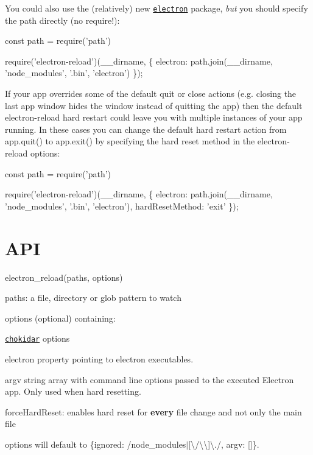 You could also use the (relatively) new \href{https://www.npmjs.com/package/electron}{\tt {\ttfamily electron}} package, {\itshape but} you should specify the path directly (no {\ttfamily require}!)\+:


\begin{DoxyCode}
const path = require('path')

require('electron-reload')(\_\_dirname, \{
  electron: path.join(\_\_dirname, 'node\_modules', '.bin', 'electron')
\});
\end{DoxyCode}


If your app overrides some of the default {\ttfamily quit} or {\ttfamily close} actions (e.\+g. closing the last app window hides the window instead of quitting the app) then the default {\ttfamily electron-\/reload} hard restart could leave you with multiple instances of your app running. In these cases you can change the default hard restart action from {\ttfamily app.\+quit()} to {\ttfamily app.\+exit()} by specifying the hard reset method in the electron-\/reload options\+:


\begin{DoxyCode}
const path = require('path')

require('electron-reload')(\_\_dirname, \{
  electron: path.join(\_\_dirname, 'node\_modules', '.bin', 'electron'),
  hardResetMethod: 'exit'
\});
\end{DoxyCode}


\section*{A\+PI}

{\ttfamily electron\+\_\+reload(paths, options)}
\begin{DoxyItemize}
\item {\ttfamily paths}\+: a file, directory or glob pattern to watch
\item {\ttfamily options} (optional) containing\+:
\begin{DoxyItemize}
\item \href{https://github.com/paulmillr/chokidar}{\tt {\ttfamily chokidar}} options
\item {\ttfamily electron} property pointing to electron executables.
\item {\ttfamily argv} string array with command line options passed to the executed Electron app. Only used when hard resetting.
\item {\ttfamily force\+Hard\+Reset}\+: enables hard reset for {\bfseries every} file change and not only the main file
\end{DoxyItemize}

{\ttfamily options} will default to {\ttfamily \{ignored\+: /node\+\_\+modules$\vert$\mbox{[}\textbackslash{}/\textbackslash{}\textbackslash{}\mbox{]}\textbackslash{}./, argv\+: \mbox{[}\mbox{]}\}}.
\end{DoxyItemize}

